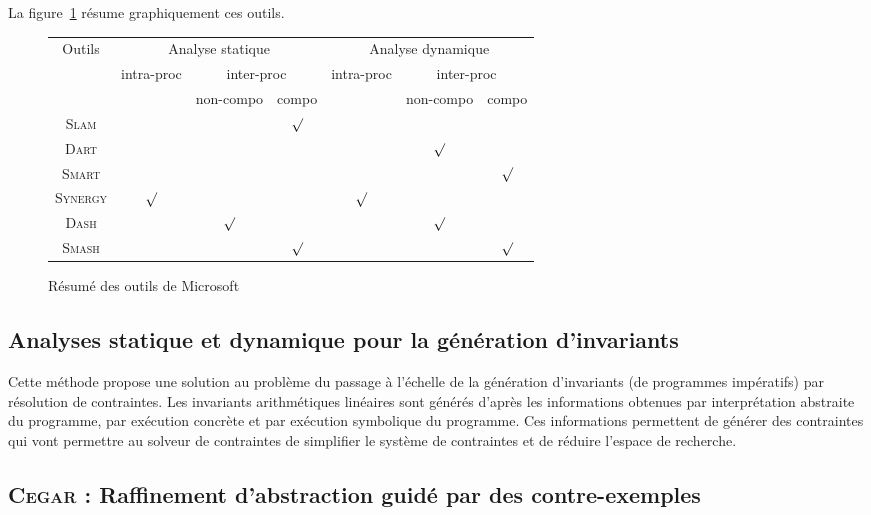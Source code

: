 La figure~\ref{fig:microsoft-summary} résume graphiquement ces outils.



\begin{figure}
  \centering
  \begin{tabular}{|c|c|c|c|c|c|c|}
    \hline
    \multirow{3}{*}{Outils} & \multicolumn{3}{c|}{Analyse statique}
    & \multicolumn{3}{c|}{Analyse dynamique} \\
    & \multirow{2}{*}{intra-proc} & \multicolumn{2}{c|}{inter-proc}
    & \multirow{2}{*}{intra-proc} & \multicolumn{2}{c|}{inter-proc} \\
    & & non-compo & compo & & non-compo & compo \\
    \hline
    \textsc{Slam} \cite{SLAM} & & & $\surd$ & & & \\
    \hline
    \textsc{Dart} \cite{DART} & & & & & $\surd$ & \\
    \hline
    \textsc{Smart} \cite{SMART} & & & & & & $\surd$ \\
    \hline
    \textsc{Synergy} \cite{SYNERGY} & $\surd$ & & & $\surd$ & & \\
    \hline
    \textsc{Dash} \cite{DASH} & & $\surd$ & & & $\surd$ & \\
    \hline
    \textsc{Smash} \cite{SMASH} & & & $\surd$ & & & $\surd$ \\
    \hline
  \end{tabular}
  \caption{Résumé des outils de Microsoft}
  \label{fig:microsoft-summary}
\end{figure}





\subsection{Analyses statique et dynamique pour la génération d'invariants}

Cette méthode \cite{fromTestsToProofs} propose une solution au problème du
passage à l'échelle de la génération d'invariants (de programmes impératifs) par
résolution de contraintes. Les invariants arithmétiques linéaires sont générés
d'après les informations obtenues par interprétation abstraite du programme, par
exécution concrète et par exécution symbolique du programme. Ces informations
permettent de générer des contraintes qui vont permettre au solveur de
contraintes de simplifier le système de contraintes et de réduire l'espace de
recherche.

\subsection{\textsc{Cegar} : Raffinement d'abstraction guidé par des
  contre-exemples}

